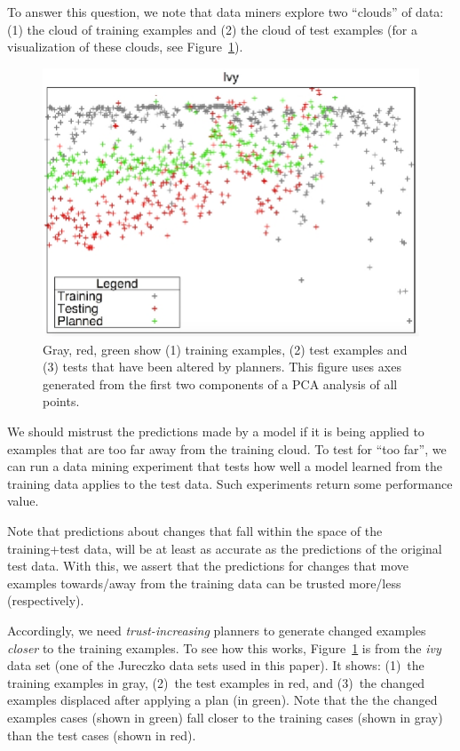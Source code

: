 \documentclass{sig-alternate}
\newcommand{\fig}[1]{Figure~\ref{fig:#1}}
\begin{document}
To answer this question, we note
that data miners explore two  ``clouds'' of data: (1) the cloud of training examples and (2) the  cloud   of test examples
(for a visualization of these clouds, see \fig{howxy}).
\begin{figure}[!t]
  \includegraphics[width=\linewidth]{figs/2d.eps} 
\caption{Gray, red, green show (1) training examples, (2) test examples and 
  (3) tests that have been altered by planners.
  This figure uses axes generated from the first two components of a PCA analysis of all points. 
}\label{fig:howxy}
\end{figure}
We should mistrust the predictions made by a  model   if it is being applied to examples  that are
too far away from the
training cloud.
To test for ``too far'', we can run a data mining experiment that tests how well
a model learned from the training data applies to the test data. Such experiments return some performance value.

Note that predictions  about changes that  fall within the space of the training+test data, will be at least
as accurate as the predictions of the original test data. With this, we assert that the predictions for changes that move examples towards/away from the training data can be trusted more/less (respectively).

Accordingly, we need {\em trust-increasing} planners to generate changed examples {\em closer} to the
training examples.  To see how this works, 
 \fig{howxy} is from the {\em ivy} data
set (one of the Jureczko data sets used in this paper). It shows: (1)~the training examples in gray, (2)~the test examples in red, and (3)~the
changed  examples displaced after applying a plan (in green).
 Note that the  the   changed examples
cases  (shown in green)  fall closer to the training cases (shown in gray) than
the test cases (shown in red). 
\end{document}
